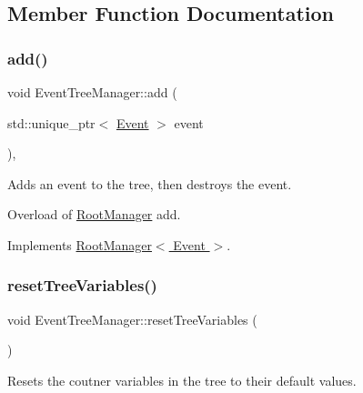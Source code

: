 \subsection{Member Function Documentation}
\mbox{\label{class_event_tree_manager_acabb2f6c8dd0e08375b4cf8bf2c148fd}} 
\subsubsection{\texorpdfstring{add()}{add()}}
{\footnotesize\ttfamily void Event\+Tree\+Manager\+::add (\begin{DoxyParamCaption}\item[{std\+::unique\+\_\+ptr$<$ \hyperlink{class_event}{Event} $>$}]{event }\end{DoxyParamCaption})\hspace{0.3cm}{\ttfamily [final]}, {\ttfamily [virtual]}}



Adds an event to the tree, then destroys the event. 

Overload of \hyperlink{class_root_manager}{Root\+Manager} add. 

Implements \hyperlink{class_root_manager_a2f05eb45d5eaee1f9f12e299395652fb}{Root\+Manager$<$ Event $>$}.

\mbox{\label{class_event_tree_manager_a88cf8288ad022053b35192445e77f9a7}} 
\subsubsection{\texorpdfstring{reset\+Tree\+Variables()}{resetTreeVariables()}}
{\footnotesize\ttfamily void Event\+Tree\+Manager\+::reset\+Tree\+Variables (\begin{DoxyParamCaption}{ }\end{DoxyParamCaption})\hspace{0.3cm}{\ttfamily [private]}}



Resets the coutner variables in the tree to their default values. 

\mbox{\label{class_event_tree_manager_a11cbe0078aeb3d0fe320bbeec335babc}} 
